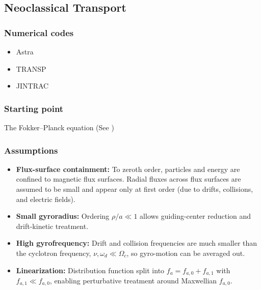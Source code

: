 \documentclass[10pt]{book}
\begin{document}
\subsection{Neoclassical Transport}

\subsubsection{Numerical codes}
\begin{itemize}
    \item Astra
    \item TRANSP
    \item JINTRAC
\end{itemize}

\subsubsection{Starting point}
The Fokker--Planck equation (See )

\subsubsection{Assumptions}
\begin{itemize}
    \item \textbf{Flux-surface containment:} To zeroth order, particles and energy are confined to magnetic flux surfaces. 
        Radial fluxes across flux surfaces are assumed to be small and appear only at first order (due to drifts, collisions, and electric fields).  
    \item \textbf{Small gyroradius:} Ordering $\rho / a \ll 1$ allows guiding-center reduction and drift-kinetic treatment.
    \item \textbf{High gyrofrequency:} Drift and collision frequencies are much smaller than the cyclotron frequency, $\nu, \omega_d \ll \Omega_c$, so gyro-motion can be averaged out.
    \item \textbf{Linearization:} Distribution function split into $f_a = f_{a,0} + f_{a,1}$ with $f_{a,1} \ll f_{a,0}$, enabling perturbative treatment around Maxwellian $f_{a,0}$.
\end{itemize}
\end{document}
